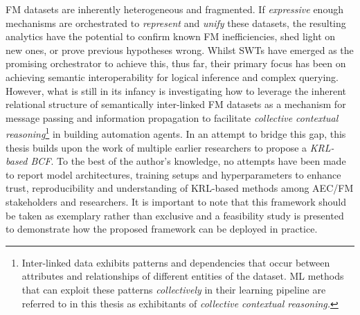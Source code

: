 \ac{FM} datasets are inherently heterogeneous and fragmented. If \textit{expressive} enough mechanisms are orchestrated to \textit{represent} and \textit{unify} these datasets, the resulting analytics have the potential to confirm known \ac{FM} inefficiencies, shed light on new ones, or prove previous hypotheses wrong. Whilst \ac{SWT}s have emerged as the promising orchestrator to achieve this, thus far, their primary focus has been on achieving semantic interoperability for logical inference and complex querying. However, what is still in its infancy is investigating how to leverage the inherent relational structure of semantically inter-linked \ac{FM} datasets as a mechanism for message passing and information propagation to facilitate \textit{collective contextual reasoning}\footnote{Inter-linked data exhibits patterns and dependencies that occur between attributes and relationships of different entities of the dataset. \ac{ML} methods that can exploit these patterns \textit{collectively} in their learning pipeline are referred to in this thesis as exhibitants of \textit{collective contextual reasoning.}} in building automation agents. In an attempt to bridge this gap, this thesis builds upon the work of multiple earlier researchers to propose a \textit{\ac{KRL-based BCF}}. To the best of the author's knowledge, no attempts have been made to report model architectures, training setups and hyperparameters to enhance trust, reproducibility and understanding of \ac{KRL}-based methods among \ac{AEC/FM} stakeholders and researchers. It is important to note that this framework should be taken as exemplary rather than exclusive and a feasibility study is presented to demonstrate how the proposed framework can be deployed in practice.


